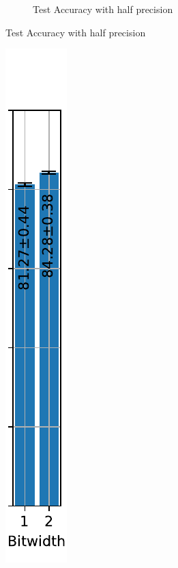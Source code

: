 \begin{figure}[!htpb]
\begin{subfigure}[H]{0.89\textwidth}
\begin{subfigure}[H]{\textwidth}
                \caption{Test Accuracy with half precision}
            \end{subfigure}
        \end{subfigure}
        \hfill
        \begin{subfigure}[H]{0.1\textwidth}
            \centering
            \includegraphics[width=\textwidth]{../bf16/FashionMNIST/plots/fashionmnist_final_acc.pdf}

\end{subfigure}
\end{figure}
